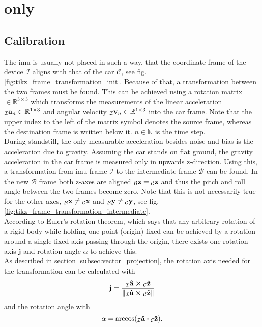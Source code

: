 \section{ only}
\subsection{Calibration}
The \gls{imu} is usually not placed in such a way, that the coordinate frame of the device $\mathcal{I}$ aligns with that of the car $\mathcal{C}$, see fig. \ref{fig:tikz_frame_transformation_init}.
Because of that, a transformation between the two frames must be found.
This can be achieved using a rotation matrix  $\in \mathbb{R}^{3\times3}$ which transforms the measurements of the linear acceleration $\vincs{a}{I}_n \in \mathbb{R}^{1\times3}$ and angular velocity ${\vincs{v}{I}_n \in \mathbb{R}^{1\times3}}$ into the car frame.
Note that the upper index to the left of the matrix symbol denotes the source frame, whereas the destination frame is written below it.
$n \in \mathbb{N}$ is the time step.\\
During standstill, the only measurable acceleration besides noise and bias is the acceleration due to gravity.
Assuming the car stands on flat ground, the gravity acceleration in the car frame is measured only in upwards z-direction.
Using this, a transformation from \gls{imu} frame $\mathcal{I}$ to the intermediate frame $\mathcal{B}$ can be found.
In the new $\mathcal{B}$ frame both z-axes are aligned $\vincs{z}{b} = \vincs{z}{c}$ and thus the pitch and roll angle between the two frames become zero.
Note that this is not necessarily true for the other axes, $\vincs{x}{b}\neq\vincs{x}{c}$ and $\vincs{y}{b}\neq\vincs{y}{c}$, see fig. \ref{fig:tikz_frame_transformation_intermediate}.\\
According to Euler's rotation theorem, which says that any arbitrary rotation of a rigid body while holding one point (origin) fixed can be achieved by a rotation around a single fixed axis passing through the origin, there exists one rotation axis $\mathbf{j}$ and rotation angle $\alpha$ to achieve this.\\
As described in section \ref{subsec:vector_projection}, the rotation axis needed for the transformation can be calculated with
\begin{equation}
    \vb{j} = \frac{\vincs{\vu{a}}{i} \cp \vincs{\vu{z}}{c}}{\norm{\vincs{\vu{a}}{i} \cp \vincs{\vu{z}}{c}}}
\end{equation}
and the rotation angle with
\begin{equation}
    \alpha = \arccos(\vincs{\vu{a}}{i}\vdot \vincs{\vu{z}}{c}).
\end{equation}

